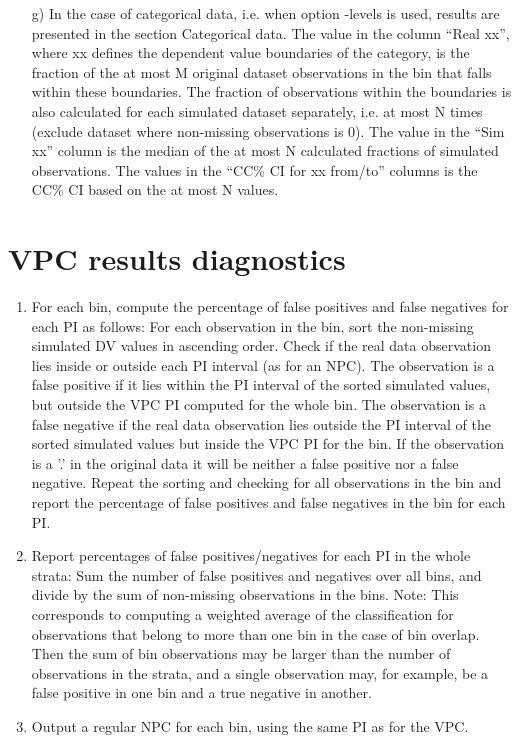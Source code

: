 \begin{itemize}
	\item[g)] In the case of categorical data, i.e. when option -levels is used, results are presented in the section Categorical data. The value in the column “Real xx”, where xx defines the dependent value boundaries of the category, is the fraction of the at most M original dataset observations in the bin that falls within these boundaries. The fraction of observations within the boundaries is also calculated for each simulated dataset separately, i.e. at most N times (exclude dataset where non-missing observations is 0). The value in the “Sim xx” column is the median of the at most N calculated fractions of simulated observations. The values in the “CC\% CI for xx from/to” columns is the CC\% CI based on the at most N values.
\end{itemize}

\section{VPC results diagnostics}

\begin{enumerate}
	\item For each bin, compute the percentage of false positives and false negatives for each PI as follows: 
For each observation in the bin, sort the non-missing simulated DV values in ascending order. Check if the real data observation lies inside or outside each PI interval (as for an NPC). The observation is a false positive if it lies within the PI interval of the sorted simulated values, but outside the VPC PI computed for the whole bin. The observation is a false negative if the real data observation lies outside the PI interval of the sorted simulated values but inside the VPC PI for the bin. If the observation is a '.' in the original data it will be neither a false positive nor a false negative. Repeat the sorting and checking for all observations in the bin and report the percentage of false positives and false negatives in the bin for each PI.

	\item Report percentages of false positives/negatives for each PI in the whole strata:
Sum the number of false positives and negatives over all bins, and divide by the sum of non-missing observations in  the bins. Note: This corresponds to computing a weighted average of the classification for observations that belong to more than one bin in the case of bin overlap. Then the sum of bin observations may be larger than the number of observations in the strata, and a single observation may, for example, be a false positive in one bin and a true negative in another. 

	\item Output a regular NPC for each bin, using the same PI as for the VPC.
\end{enumerate}


